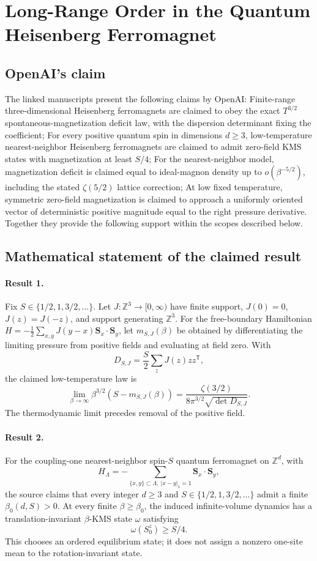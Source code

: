 \documentclass[11pt]{article}
\begin{document}
\section*{Long-Range Order in the Quantum Heisenberg Ferromagnet}

\subsection{OpenAI's claim}
The linked manuscripts present the following claims by OpenAI: Finite-range three-dimensional Heisenberg ferromagnets are claimed to obey the exact $T^{3/2}$ spontaneous-magnetization deficit law, with the dispersion determinant fixing the coefficient; For every positive quantum spin in dimensions $d\geq3$, low-temperature nearest-neighbor Heisenberg ferromagnets are claimed to admit zero-field KMS states with magnetization at least $S/4$; For the nearest-neighbor model, magnetization deficit is claimed equal to ideal-magnon density up to $o(\beta^{-5/2})$, including the stated $\zeta(5/2)$ lattice correction; At low fixed temperature, symmetric zero-field magnetization is claimed to approach a uniformly oriented vector of deterministic positive magnitude equal to the right pressure derivative. Together they provide the following support within the scopes described below.

\subsection{Mathematical statement of the claimed result}
\paragraph{Result 1.} Fix \(S\in\{1/2,1,3/2,\ldots\}\). Let \(J:\mathbb Z^3\to[0,\infty)\) have finite support, \(J(0)=0\), \(J(z)=J(-z)\), and support generating \(\mathbb Z^3\). For the free-boundary Hamiltonian \(H=-\tfrac12\sum_{x,y}J(y-x)\boldsymbol S_x\cdot\boldsymbol S_y\), let \(m_{S,J}(\beta)\) be obtained by differentiating the limiting pressure from positive fields and evaluating at field zero. With
\[
 D_{S,J}=\frac S2\sum_zJ(z)zz^{\mathsf T},
\]
the claimed low-temperature law is
\[
 \lim_{\beta\to\infty}\beta^{3/2}(S-m_{S,J}(\beta))
 =\frac{\zeta(3/2)}{8\pi^{3/2}\sqrt{\det D_{S,J}}}.
\]
The thermodynamic limit precedes removal of the positive field.

\paragraph{Result 2.} For the coupling-one nearest-neighbor spin-\(S\) quantum ferromagnet on \(\mathbb Z^d\), with
\[
 H_\Lambda=-\sum_{\{x,y\}\subset\Lambda,\ |x-y|_1=1}\boldsymbol S_x\cdot\boldsymbol S_y,
\]
the source claims that every integer \(d\ge3\) and \(S\in\{1/2,1,3/2,\ldots\}\) admit a finite \(\beta_0(d,S)>0\). At every finite \(\beta\ge\beta_0\), the induced infinite-volume dynamics has a translation-invariant \(\beta\)-KMS state \(\omega\) satisfying
\[
 \omega(S_0^z)\ge S/4.
\]
This chooses an ordered equilibrium state; it does not assign a nonzero one-site mean to the rotation-invariant state.
\end{document}
